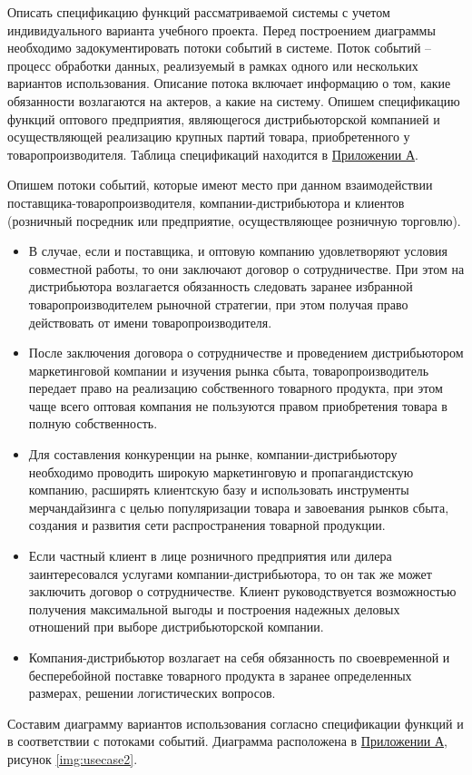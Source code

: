 \documentclass[a4paper,14pt]{extarticle}
\begin{document}
\begin{problem}
	Описать спецификацию функций рассматриваемой системы с учетом
	индивидуального варианта учебного проекта.
	Перед построением диаграммы необходимо задокументировать потоки
	событий в системе.
	Поток событий – процесс обработки данных, реализуемый в рамках одного
	или нескольких вариантов использования. Описание потока включает
	информацию о том, какие обязанности возлагаются на актеров, а какие на
	систему.
	\nonum
	Опишем спецификацию функций оптового предприятия, являющегося дистрибьюторской компанией и осуществляющей реализацию крупных партий товара, приобретенного у товаропроизводителя. Таблица спецификаций находится в \hyperref[tam]{Приложении А}.	
	

	Опишем потоки событий, которые имеют место при данном взаимодействии поставщика-товаропроизводителя, компании-дистрибьютора и клиентов (розничный посредник или предприятие, осуществляющее розничную торговлю).
	\begin{itemize}
		\item В случае, если и поставщика, и оптовую компанию удовлетворяют условия совместной работы, то они заключают договор о сотрудничестве. При этом на дистрибьютора возлагается обязанность следовать заранее избранной товаропроизводителем рыночной стратегии, при этом получая право действовать от имени товаропроизводителя.
		\item После заключения договора о сотрудничестве и проведением дистрибьютором маркетинговой компании и изучения рынка сбыта, товаропроизводитель передает право на реализацию собственного товарного продукта, при этом чаще всего оптовая компания не пользуются правом приобретения товара в полную собственность.
		\item Для составления конкуренции на рынке, компании-дистрибьютору необходимо проводить широкую маркетинговую и пропагандистскую компанию, расширять клиентскую базу и  использовать инструменты мерчандайзинга с целью популяризации товара и завоевания рынков сбыта, создания и развития сети распространения товарной продукции.
		\item Если частный клиент в лице розничного предприятия или дилера заинтересовался услугами компании-дистрибьютора, то он так же может заключить договор о сотрудничестве. Клиент руководствуется возможностью получения максимальной выгоды и построения надежных деловых отношений при выборе дистрибьюторской компании.
		\item Компания-дистрибьютор возлагает на себя обязанность по своевременной и бесперебойной поставке товарного продукта в заранее определенных размерах, решении логистических вопросов.		
	\end{itemize}
	Составим диаграмму вариантов использования согласно спецификации функций и в соответствии с потоками событий. Диаграмма расположена в \hyperref[tam]{Приложении А}, рисунок \ref{img:usecase2}.

\end {problem}
\end{document}
